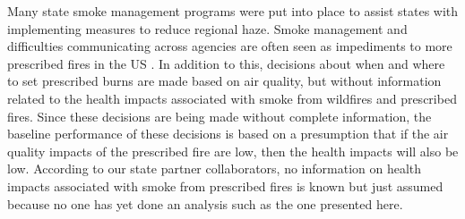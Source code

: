 \documentclass[authoryear]{elsarticle}
\begin{document}
Many state smoke management programs were put into place to assist states with implementing measures to reduce regional haze. Smoke management and difficulties communicating across agencies are often seen as impediments to more prescribed fires in the US \citep{SneeuwjagtOpportunities2013}. In addition to this, decisions about when and where to set prescribed burns are made based on air quality, but without information related to the health impacts associated with smoke from wildfires and prescribed fires. Since these decisions are being made without complete information, the baseline performance of these decisions is based on a presumption that if the air quality impacts of the prescribed fire are low, then the health impacts will also be low. According to our state partner collaborators, no information on health impacts associated with smoke from prescribed fires is known but just assumed because no one has yet done an analysis such as the one presented here. 
\end{document}
